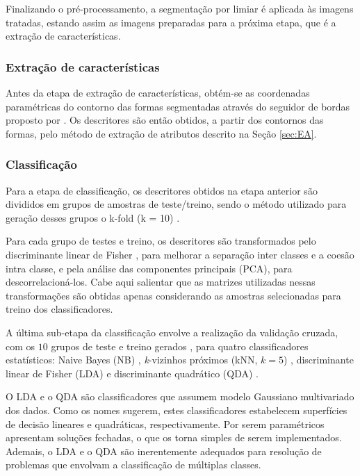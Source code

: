 Finalizando o pré-processamento, a segmentação por limiar \cite{Gonzalez:2006} é aplicada às imagens tratadas, estando assim as imagens preparadas para a próxima etapa, que é a extração de características.

\subsubsection*{Extração de características}

Antes da etapa de extração de características, obtém-se as coordenadas paramétricas do contorno das formas segmentadas através do seguidor de bordas proposto por .
Os descritores são então obtidos, a partir dos contornos das formas, pelo método de extração de atributos descrito na Seção \ref{sec:EA}. 

\subsubsection*{Classificação}

Para a etapa de classificação, os descritores  obtidos na etapa anterior são divididos em grupos de amostras de teste/treino, sendo o método utilizado para geração desses grupos o k-fold (k = 10) \cite{Webb:2002}. 

Para cada grupo de testes e treino, os descritores são  transformados pelo discriminante linear de Fisher \cite{Webb:2002}, para melhorar a separação inter classes e a coesão intra classe, e pela análise das componentes principais (PCA), para  descorrelacioná-los. Cabe aqui salientar que as matrizes utilizadas nessas transformações são obtidas apenas considerando as amostras selecionadas para treino dos classificadores.

A última sub-etapa da classificação envolve a realização da validação cruzada, com os $10$ grupos de teste e treino gerados \cite{Webb:2002}, para quatro classificadores estatísticos: Naive Bayes (NB) \cite{Fukunaga:1990}, \emph{k}-vizinhos próximos (\ac{kNN}, $k = 5$) \cite{Fukunaga:1990,Webb:2002}, discriminante linear de Fisher (\ac{LDA}) \cite{Webb:2002} e discriminante quadrático (\ac{QDA}) \cite{Fukunaga:1990}. 

O \ac{LDA} e o \ac{QDA} são classificadores que assumem modelo Gaussiano multivariado dos dados. Como os nomes sugerem,  estes classificadores estabelecem superfícies de decisão lineares e quadráticas, respectivamente. Por serem paramétricos apresentam soluções fechadas, o que os torna simples de serem implementados. Ademais, o \ac{LDA} e o \ac{QDA} são inerentemente adequados para resolução de problemas que envolvam a classificação de múltiplas classes.

